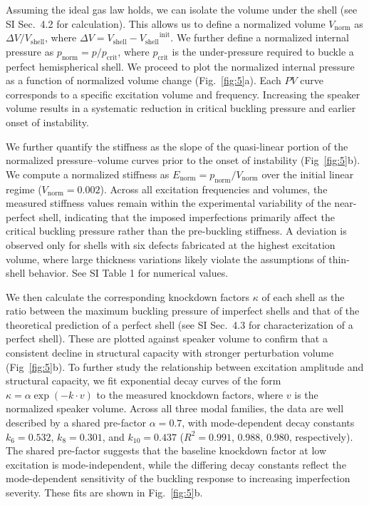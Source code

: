 \documentclass[twocolumn,letter,11pt]{article}
\begin{document}
Assuming the ideal gas law holds, we can isolate the volume under the shell (see SI Sec.~4.2 for calculation). This allows us to define a normalized volume $V_\mathrm{norm}$ as $\Delta V / V_{\mathrm{shell}}$, where $\Delta V= V_\mathrm{shell}-{V_\mathrm{shell}}^\mathrm{init}$. 
We further define a normalized internal pressure as $p_{\mathrm{norm}}=p/p_\mathrm{crit}$, where $p_\mathrm{crit}$ is the under-pressure required to buckle a perfect hemispherical shell. We proceed to plot the normalized internal pressure as a function of normalized volume change (Fig.~\ref{fig:5}a). Each $PV$ curve corresponds to a specific excitation volume and frequency. Increasing the speaker volume results in a systematic reduction in critical buckling pressure and earlier onset of instability. 

We further quantify the stiffness as the slope of the quasi-linear portion of the normalized pressure--volume curves prior to the onset of instability (Fig~\ref{fig:5}b). We compute a normalized stiffness as $E_\mathrm{norm}=p_\mathrm{norm}/V_\mathrm{norm}$ over the initial linear regime ($V_\mathrm{norm}=0.002$). Across all excitation frequencies and volumes, the measured stiffness values remain within the experimental variability of the near-perfect shell, indicating that the imposed imperfections primarily affect the critical buckling pressure rather than the pre-buckling stiffness. A deviation is observed only for shells with six defects fabricated at the highest excitation volume, where large thickness variations likely violate the assumptions of thin-shell behavior. See SI Table 1 for numerical values.

We then calculate the corresponding knockdown factors $\kappa$ of each shell as the ratio between the maximum buckling pressure of imperfect shells and that of the theoretical prediction of a perfect shell (see SI Sec.~4.3 for characterization of a perfect shell). These are plotted against speaker volume to confirm that a consistent decline in structural capacity with stronger perturbation volume (Fig~\ref{fig:5}b). To further study the relationship between excitation amplitude 
and structural capacity, we fit exponential decay curves of the form $\kappa = \alpha \exp(-k \cdot v)$ to the measured knockdown factors, where $v$ is the normalized speaker volume. Across all three modal families, the data are well described by a shared pre-factor $\alpha = 0.7$, with mode-dependent decay constants $k_6 = 0.532$, $k_8 = 0.301$, and $k_{10} = 0.437$ ($R^2 = 0.991$, 0.988, 0.980, respectively). The shared pre-factor suggests that the baseline knockdown factor at low excitation is mode-independent, while the differing decay constants reflect the mode-dependent sensitivity of the buckling response to increasing imperfection severity. These fits are shown in Fig.~\ref{fig:5}b.
\end{document}
